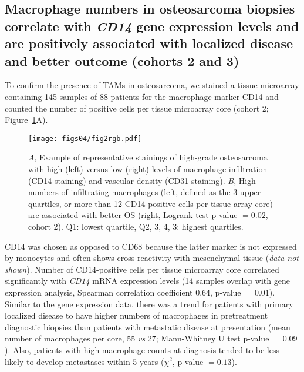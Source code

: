 \subsection{Macrophage numbers in osteosarcoma biopsies
correlate with {\it CD14} gene expression levels and are
positively associated with localized disease and better
outcome (cohorts 2 and 3)}
To confirm the presence of TAMs in osteosarcoma, we
stained a tissue microarray containing 145 samples of 88
patients for the macrophage marker CD14 and counted the
number of positive cells per tissue microarray core (cohort
2; Figure~\ref{fig4.2}A).
%
%
\begin{figure}[htbp]
	\centering
	\texttt{[image: figs04/fig2rgb.pdf]}	%
	\caption{{\it A}, Example of representative stainings of high\hyp{}grade osteosarcoma with high (left) versus low (right) levels of macrophage infiltration (CD14 staining) and vascular density (CD31 staining). {\it B}, High numbers of infiltrating macrophages (left, defined as the 3 upper quartiles, or more than 12 CD14\hyp{}positive cells per tissue array core) are associated with better OS (right, Logrank test p-value $=0.02$, cohort 2). Q1: lowest quartile, Q2, 3, 4, 3: highest quartiles.}
	\label{fig4.2}
\end{figure}
%
CD14 was chosen as opposed to CD68 because
the latter marker is not expressed by monocytes and often
shows cross\hyp{}reactivity with mesenchymal tissue ({\it data not
shown}). Number of CD14\hyp{}positive cells per tissue microarray
core correlated significantly with {\it CD14} mRNA expression
levels (14 samples overlap with gene expression
analysis, Spearman correlation coefficient 0.64, p-value $=0.01$). Similar to the gene expression data, there was a
trend for patients with primary localized disease to have
higher numbers of macrophages in pretreatment diagnostic
biopsies than patients with metastatic disease at presentation
(mean number of macrophages per core, 55 {\it vs} 27;
Mann\hyp{}Whitney U test p-value $=0.09$). Also, patients with
high macrophage counts at diagnosis tended to be less
likely to develop metastases within 5 years ($\chi^2$, p-value $=0.13$).

